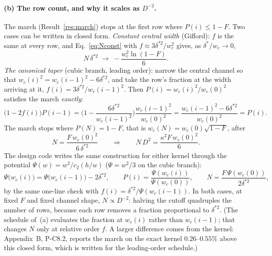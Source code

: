 \paragraph{(b) The row count, and why it scales as $D^{-2}$.} The march (Result~\ref{res:march})
stops at the first row where $P(i)\le1-F$. Two cases can be written in closed form.
\emph{Constant central width} (Gifford): $f$ is the same at every row, and
Eq.~\eqref{eq:Nconst} with $f\approx3\delta^{*2}/w_c^2$ gives, as $\delta^*/w_c\to0$,
\begin{equation}
N\,\delta^{*2}\;\to\;-\frac{w_c^2\ln(1-F)}{6}.
\end{equation}
\emph{The canonical taper} (cubic branch, leading order): narrow the central channel so that
$w_c(i)^2=w_c(i-1)^2-6\delta^{*2}$, and take the row's fraction at the width arriving at it,
$f(i)=3\delta^{*2}/w_c(i-1)^2$. Then $P(i)=w_c(i)^2/w_c(0)^2$ satisfies the march \emph{exactly}:
\begin{equation}
\big(1-2f(i)\big)P(i-1)=\Big(1-\frac{6\delta^{*2}}{w_c(i-1)^2}\Big)\frac{w_c(i-1)^2}{w_c(0)^2}
=\frac{w_c(i-1)^2-6\delta^{*2}}{w_c(0)^2}=P(i).
\end{equation}
The march stops where $P(N)=1-F$, that is $w_c(N)=w_c(0)\sqrt{1-F}$, after
\begin{equation}
N=\frac{F\,w_c(0)^2}{6\,\delta^{*2}}\qquad\Longrightarrow\qquad N\,D^2=\frac{\kappa^2F\,w_c(0)^2}{6}.
\end{equation}
The design code writes the same construction for either kernel through the potential
$\Psi(w)=w^2/c_2(h/w)$ ($\Psi=w^2/3$ on the cubic branch):
\begin{equation}
\Psi\big(w_c(i)\big)=\Psi\big(w_c(i-1)\big)-2\delta^{*2},\qquad
P(i)=\frac{\Psi(w_c(i))}{\Psi(w_c(0))},\qquad
N=\frac{F\,\Psi(w_c(0))}{2\delta^{*2}},
\end{equation}
by the same one-line check with $f(i)=\delta^{*2}/\Psi(w_c(i-1))$. In both cases, at fixed $F$ and fixed channel
shape, $N\propto D^{-2}$: halving the cutoff quadruples the number of rows, because each row
removes a fraction proportional to $\delta^{*2}$. (The schedule of~(a) evaluates the fraction at $w_c(i)$ rather than $w_c(i-1)$; that changes $N$
only at relative order $f$. A larger difference comes from the kernel: Appendix~B, P-C8.2, reports
the march on the exact kernel $0.26$--$0.55\%$ above this closed form, which is written for the
leading-order schedule.)


